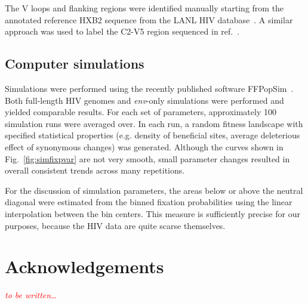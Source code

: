 \documentclass[rmp, twocolumn]{revtex4}
\newcommand{\comment}[1]{\textit{\textcolor{red}{#1}}}
\newcommand{\FIG}[1]{Fig.~\ref{fig:#1}}
\newcommand{\env}{\textit{env}}
\begin{document}
The V loops and flanking regions were identified manually starting from the
annotated reference HXB2 sequence from the LANL HIV database~\citep{LANL2012}. A
similar approach was used to label the C2-V5 region sequenced in
ref.~\citep{shankarappa_consistent_1999}.

\subsection{Computer simulations}
Simulations were performed using the recently published software
FFPopSim~\citep{zanini_ffpopsim:_2012}. Both full-length HIV genomes and
\env{}-only simulations were performed and yielded comparable results. For each
set of parameters, approximately 100 simulation runs were averaged over. In each
run, a random fitness landscape with specified statistical properties (e.g.
density of beneficial sites, average deleterious effect of synonymous changes) was generated.
Although the curves shown in \FIG{simfixpvar} are not very smooth, small
parameter changes resulted in overall consistent trends across many repetitions.

For the discussion of simulation parameters, the areas below or above the neutral
diagonal were estimated from the binned fixation probabilities using the linear
interpolation between the bin centers. This measure is sufficiently precise for
our purposes, because the HIV data are quite scarse themselves.

\section*{Acknowledgements}
\comment{to be written\dots}




\end{document}
